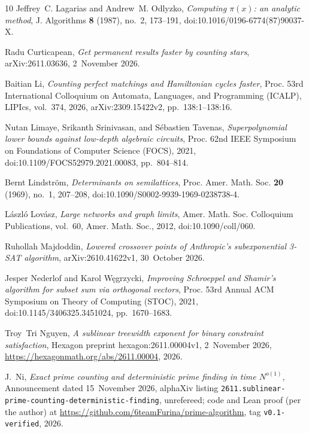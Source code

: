 \documentclass[10pt]{amsart}
\theoremstyle{plain}
\theoremstyle{definition}
\theoremstyle{remark}
\numberwithin{equation}{section}
\begin{document}
\begin{thebibliography}{10}
Jeffrey~C. Lagarias and Andrew~M. Odlyzko, \emph{Computing $\pi(x)$: an
  analytic method}, J. Algorithms \textbf{8} (1987), no.~2, 173--191,
  doi:10.1016/0196-6774(87)90037-X.

Radu Curticapean, \emph{Get permanent results faster by counting stars}, arXiv:2611.03636, 2~November 2026.

Baitian Li, \emph{Counting perfect matchings and {H}amiltonian cycles faster},
  Proc. 53rd International Colloquium on Automata, Languages, and Programming
  (ICALP), LIPIcs, vol.~374, 2026, arXiv:2309.15422v2, pp.~138:1--138:16.

Nutan Limaye, Srikanth Srinivasan, and S{\'e}bastien Tavenas,
  \emph{Superpolynomial lower bounds against low-depth algebraic circuits},
  Proc. 62nd IEEE Symposium on Foundations of Computer Science (FOCS), 2021,
  doi:10.1109/FOCS52979.2021.00083, pp.~804--814.

Bernt Lindstr{\"o}m, \emph{Determinants on semilattices}, Proc. Amer. Math.
  Soc. \textbf{20} (1969), no.~1, 207--208,
  doi:10.1090/S0002-9939-1969-0238738-4.

L{\'a}szl{\'o} Lov{\'a}sz, \emph{Large networks and graph limits}, Amer. Math.
  Soc. Colloquium Publications, vol.~60, Amer. Math. Soc., 2012,
  doi:10.1090/coll/060.

Ruhollah Majdoddin, \emph{Lowered crossover points of {A}nthropic's
  subexponential {3-SAT} algorithm}, arXiv:2610.41622v1, 30~October 2026.

Jesper Nederlof and Karol W{\k{e}}grzycki, \emph{Improving {S}chroeppel and
  {S}hamir's algorithm for subset sum via orthogonal vectors}, Proc. 53rd
  Annual ACM Symposium on Theory of Computing (STOC), 2021,
  doi:10.1145/3406325.3451024, pp.~1670--1683.

Troy~Tri Nguyen, \emph{A sublinear treewidth exponent for binary constraint
  satisfaction}, Hexagon preprint hexagon:2611.00004v1, 2~November 2026,
  \url{https://hexagonmath.org/abs/2611.00004}, 2026.

J.~Ni, \emph{Exact prime counting and deterministic prime finding in time
  {$N^{o(1)}$}}, Announcement dated 15~November 2026, alphaXiv listing
  \texttt{2611.sublinear-prime-counting-deterministic-finding}, unrefereed; code
  and Lean proof (per the author) at
  \url{https://github.com/6teamFurina/prime-algorithm}, tag
  \texttt{v0.1-verified}, 2026.


\end{thebibliography}
\end{document}
